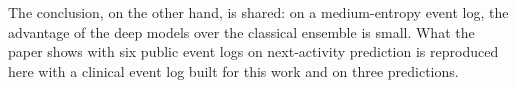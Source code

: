 The conclusion, on the other hand, is shared: on a medium-entropy event log, the advantage of the deep models over the classical ensemble is small. What the paper shows with six public event logs on next-activity prediction is reproduced here with a clinical event log built for this work and on three predictions.
